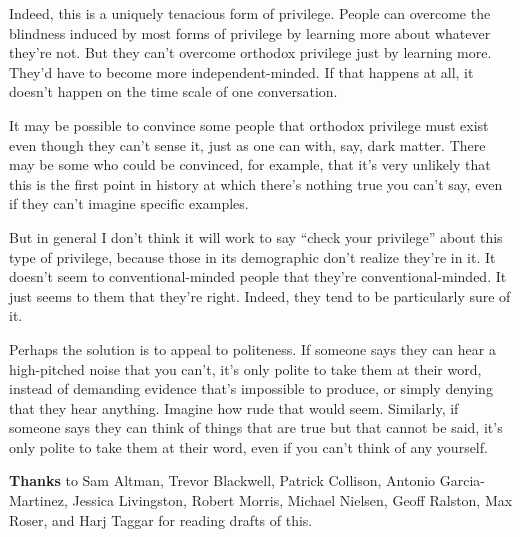 Indeed, this is a uniquely tenacious form of privilege. People can
overcome the blindness induced by most forms of privilege by learning
more about whatever they're not. But they can't overcome orthodox
privilege just by learning more. They'd have to become more
independent-minded. If that happens at all, it doesn't happen on the
time scale of one conversation.

It may be possible to convince some people that orthodox privilege must
exist even though they can't sense it, just as one can with, say, dark
matter. There may be some who could be convinced, for example, that it's
very unlikely that this is the first point in history at which there's
nothing true you can't say, even if they can't imagine specific
examples.

But in general I don't think it will work to say ``check your
privilege'' about this type of privilege, because those in its
demographic don't realize they're in it. It doesn't seem to
conventional-minded people that they're conventional-minded. It just
seems to them that they're right. Indeed, they tend to be particularly
sure of it.

Perhaps the solution is to appeal to politeness. If someone says they
can hear a high-pitched noise that you can't, it's only polite to take
them at their word, instead of demanding evidence that's impossible to
produce, or simply denying that they hear anything. Imagine how rude
that would seem. Similarly, if someone says they can think of things
that are true but that cannot be said, it's only polite to take them at
their word, even if you can't think of any yourself.

\textbf{Thanks} to Sam Altman, Trevor Blackwell, Patrick Collison,
Antonio Garcia-Martinez, Jessica Livingston, Robert Morris, Michael
Nielsen, Geoff Ralston, Max Roser, and Harj Taggar for reading drafts of
this.